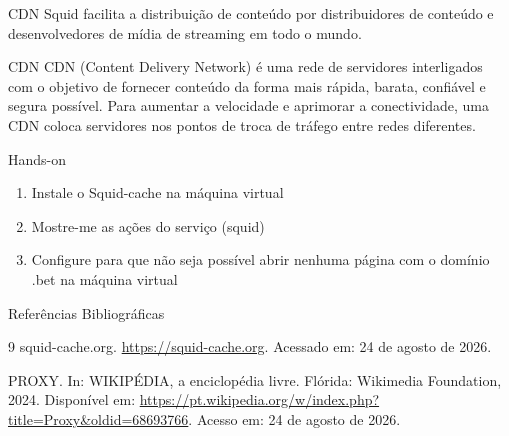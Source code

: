 \documentclass{if-beamer}
\begin{document}
		\begin{frame}{CDN}
			Squid facilita a distribuição de conteúdo por distribuidores de conteúdo e desenvolvedores de mídia de
			streaming em todo o mundo. 
			\begin{block}{CDN}
				 CDN (Content Delivery Network) é uma rede de servidores interligados com o objetivo de fornecer conteúdo da forma mais rápida, barata, confiável e segura possível. Para aumentar a velocidade e aprimorar a conectividade, uma CDN coloca servidores nos pontos de troca de tráfego entre redes diferentes. 
			\end{block}				
		\end{frame}


		\begin{frame}{Hands-on}
			\begin{enumerate}
				\item Instale o Squid-cache na máquina virtual
				\item Mostre-me as ações do serviço (squid)
				\item Configure para que não seja possível abrir nenhuma página com o domínio .bet na máquina virtual
			\end{enumerate}
			
		\end{frame}
		





\begin{frame}[allowframebreaks]{Referências Bibliográficas}
	\begin{thebibliography}{9}
		squid-cache.org. \url{https://squid-cache.org}. Acessado em: 24 de agosto de 2026.

		PROXY. In: WIKIPÉDIA, a enciclopédia livre. Flórida: Wikimedia Foundation, 2024. 
		Disponível em: \url{https://pt.wikipedia.org/w/index.php?title=Proxy&oldid=68693766}. Acesso em: 24 de agosto de 2026.
	\end{thebibliography}
\end{frame}		

		
	
\end{document}
